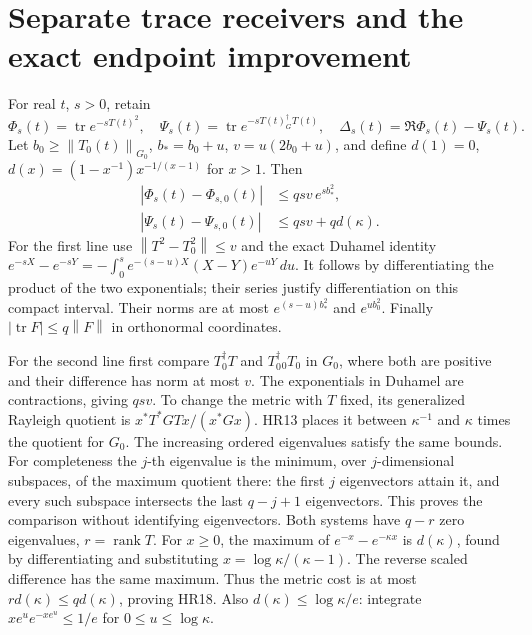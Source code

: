 \documentclass[11pt]{article}
\newcommand{\tr}{\operatorname{tr}}\newcommand{\dd}{\dagger_G}
\newcommand{\norm}[1]{\left\lVert#1\right\rVert}
\begin{document}
\section{Separate trace receivers and the exact endpoint improvement}

For real \(t\), \(s>0\), retain
\begin{equation}\tag{HR17}\label{HR17}
\Phi_s(t)=\tr e^{-sT(t)^2},\quad
\Psi_s(t)=\tr e^{-sT(t)^\dd T(t)},\quad
\Delta_s(t)=\Re\Phi_s(t)-\Psi_s(t).
\end{equation}
Let \(b_0\ge\norm{T_0(t)}_{G_0}\), \(b_*=b_0+u\),
\(v=u(2b_0+u)\), and define
\(d(1)=0\), \(d(x)=(1-x^{-1})x^{-1/(x-1)}\) for \(x>1\).
Then
\begin{equation}\tag{HR18}\label{HR18}
\begin{split}
|\Phi_s(t)-\Phi_{s,0}(t)|&\le qsv\,e^{s b_*^2},\\
|\Psi_s(t)-\Psi_{s,0}(t)|&\le qsv+q d(\kappa).
\end{split}
\end{equation}
For the first line use \(\norm{T^2-T_0^2}\le v\) and the exact
Duhamel identity
\(e^{-sX}-e^{-sY}=-\int_0^s e^{-(s-u)X}(X-Y)e^{-uY}\,du\).
It follows by differentiating the product of the two exponentials;
their series justify differentiation on this compact interval.
Their norms are at most \(e^{(s-u)b_*^2}\) and \(e^{ub_0^2}\).
Finally \(|\tr F|\le q\norm F\) in orthonormal coordinates.

For the second line first compare \(T^\dagger_0T\) and
\(T_0^\dagger_0T_0\) in \(G_0\), where both are positive and their
difference has norm at most \(v\). The exponentials in Duhamel are
contractions, giving \(qsv\). To change the metric with \(T\) fixed,
its generalized Rayleigh quotient is
\(x^*T^*GTx/(x^*Gx)\). HR13 places it between \(\kappa^{-1}\) and
\(\kappa\) times the quotient for \(G_0\). The increasing ordered
eigenvalues satisfy the same bounds. For completeness the \(j\)-th
eigenvalue is the minimum, over \(j\)-dimensional subspaces, of the
maximum quotient there: the first \(j\) eigenvectors attain it, and
every such subspace intersects the last \(q-j+1\) eigenvectors.
This proves the comparison without identifying eigenvectors.
Both systems have \(q-r\) zero eigenvalues, \(r=\operatorname{rank}T\).
For \(x\ge0\), the maximum of \(e^{-x}-e^{-\kappa x}\) is
\(d(\kappa)\), found by differentiating and substituting
\(x=\log\kappa/(\kappa-1)\). The reverse scaled difference has
the same maximum. Thus the metric cost is at most
\(r d(\kappa)\le qd(\kappa)\), proving HR18.
Also \(d(\kappa)\le\log\kappa/e\): integrate
\(xe^u e^{-xe^u}\le1/e\) for \(0\le u\le\log\kappa\).
\end{document}
